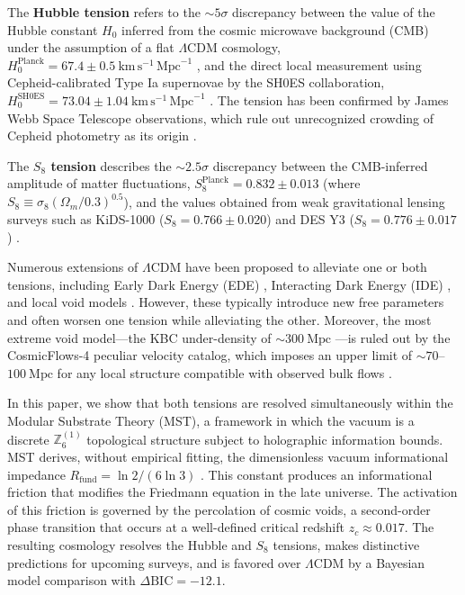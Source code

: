 \documentclass[12pt,a4paper]{article}
\theoremstyle{plain}
\theoremstyle{definition}
\theoremstyle{remark}
\begin{document}
The \textbf{Hubble tension} refers to the \(\sim5\sigma\) discrepancy between the value of the Hubble constant \(H_0\) inferred from the cosmic microwave background (CMB) under the assumption of a flat \(\Lambda\)CDM cosmology, \(H_0^{\text{Planck}} = 67.4 \pm 0.5\ \text{km}\,\text{s}^{-1}\,\text{Mpc}^{-1}\) \cite{Planck2018}, and the direct local measurement using Cepheid-calibrated Type Ia supernovae by the SH0ES collaboration, \(H_0^{\text{SH0ES}} = 73.04 \pm 1.04\ \text{km}\,\text{s}^{-1}\,\text{Mpc}^{-1}\) \cite{Riess2022}. The tension has been confirmed by James Webb Space Telescope observations, which rule out unrecognized crowding of Cepheid photometry as its origin \cite{Riess2024}.

The \textbf{\(S_8\) tension} describes the \(\sim2.5\sigma\) discrepancy between the CMB-inferred amplitude of matter fluctuations, \(S_8^{\text{Planck}} = 0.832 \pm 0.013\) (where \(S_8 \equiv \sigma_8(\Omega_m/0.3)^{0.5}\)), and the values obtained from weak gravitational lensing surveys such as KiDS-1000 (\(S_8 = 0.766 \pm 0.020\)) \cite{KiDS2021} and DES Y3 (\(S_8 = 0.776 \pm 0.017\)) \cite{DES2022}.

Numerous extensions of \(\Lambda\)CDM have been proposed to alleviate one or both tensions, including Early Dark Energy (EDE) \cite{Poulin2019}, Interacting Dark Energy (IDE) \cite{DiValentino2020}, and local void models \cite{KBC2013}. However, these typically introduce new free parameters and often worsen one tension while alleviating the other. Moreover, the most extreme void model---the KBC under-density of \(\sim300\ \text{Mpc}\) \cite{KBC2013}---is ruled out by the CosmicFlows-4 peculiar velocity catalog, which imposes an upper limit of \(\sim70\)--\(100\ \text{Mpc}\) for any local structure compatible with observed bulk flows \cite{Mazurenko2024}.

In this paper, we show that both tensions are resolved simultaneously within the Modular Substrate Theory (MST), a framework in which the vacuum is a discrete \(\mathbb{Z}_6^{(1)}\) topological structure subject to holographic information bounds. MST derives, without empirical fitting, the dimensionless vacuum informational impedance \(R_{\text{fund}} = \ln 2/(6\ln 3)\) \cite{MSTfound}. This constant produces an informational friction that modifies the Friedmann equation in the late universe. The activation of this friction is governed by the percolation of cosmic voids, a second-order phase transition that occurs at a well-defined critical redshift \(z_c \approx 0.017\). The resulting cosmology resolves the Hubble and \(S_8\) tensions, makes distinctive predictions for upcoming surveys, and is favored over \(\Lambda\)CDM by a Bayesian model comparison with \(\Delta\text{BIC} = -12.1\).
\end{document}
